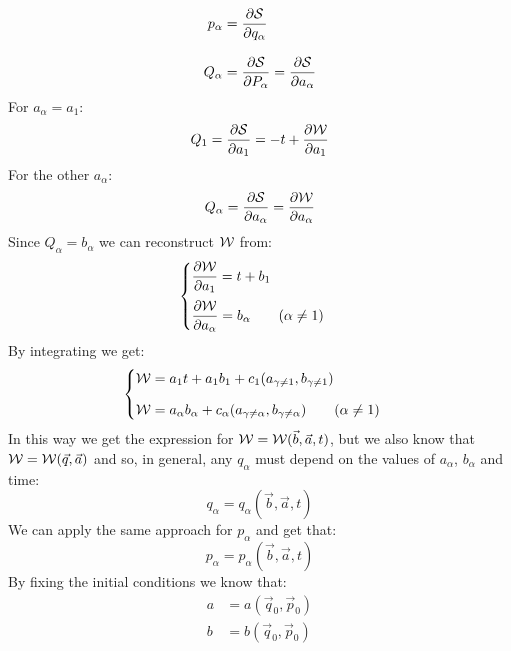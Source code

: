 \begin{equation}
  \begin{split}
    p_{\alpha} &= \pdv{\action}{q_{\alpha}}\\[8pt]
    Q_{\alpha} &= \pdv{\action}{P_{\alpha}} = \pdv{\action}{a_{\alpha}}
  \end{split}
\end{equation}
For $a_{\alpha} = a_1$:
\begin{equation}
  Q_1 = \pdv{\action}{a_1} = -t + \pdv{\hamch}{a_1}
\end{equation}
For the other $a_{\alpha}$:
\begin{equation}
  Q_{\alpha} = \pdv{\action}{a_{\alpha}} = \pdv{\hamch}{a_{\alpha}}
\end{equation}
Since $Q_{\alpha} = b_{\alpha}$ we can reconstruct $\mathcal{W}$ from:
\begin{equation}
  \begin{cases}
    \pdv{\hamch}{a_1} = t + b_1\\[10pt]
    \pdv{\hamch}{a_{\alpha}} = b_{\alpha} \quad \quad (\alpha \neq 1)
  \end{cases}
\end{equation}
By integrating we get:
\begin{equation}
  \begin{cases}
    \mathcal{W} = a_1t + a_1b_1 + c_1(a_{\gamma \neq 1}, b_{\gamma \neq 1})\\[8pt]
    \mathcal{W} = a_{\alpha}b_{\alpha} + c_{\alpha}(a_{\gamma \neq \alpha}, b_{\gamma \neq \alpha}) \quad \quad (\alpha \neq 1)
  \end{cases}
\end{equation}
In this way we get the expression for $\mathcal{W} = \mathcal{W} (\vec{b},\vec{a},t)$, but we also know that $\mathcal{W} = \mathcal{W} (\vec{q},\vec{a})$ and so, in general, any $q_{\alpha}$ must depend on the values of $a_{\alpha}$, $b_{\alpha}$ and time:
\begin{equation}
  q_{\alpha} = q_{\alpha}(\vec{b},\vec{a},t)
\end{equation}
We can apply the same approach for $p_{\alpha}$ and get that:
\begin{equation}
  p_{\alpha} = p_{\alpha}(\vec{b},\vec{a},t)
\end{equation}
By fixing the initial conditions we know that:
\begin{equation}
  \begin{split}
    a &= a(\vec{q}_0,\vec{p}_0)\\[8pt]
    b &= b(\vec{q}_0,\vec{p}_0)
  \end{split}
\end{equation}
